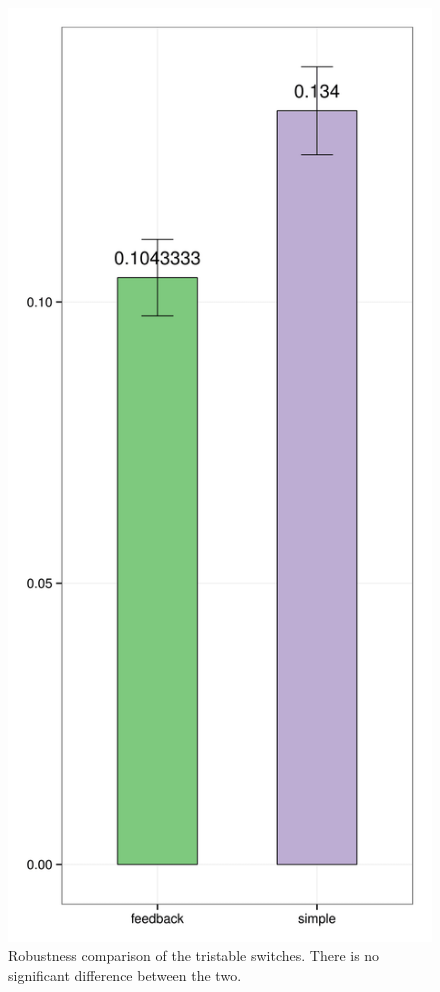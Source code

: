 \begin{figure}[h!]
\begin{center}
\includegraphics[scale=0.1]{chapterModelling/mass_action_switches/bi_tri_same_priors/robustness_comparison_tri.png}
\caption{Robustness comparison of the tristable switches. There is no significant difference between the two.}\label{fig_4}
\end{center}
\end{figure}
\clearpage

